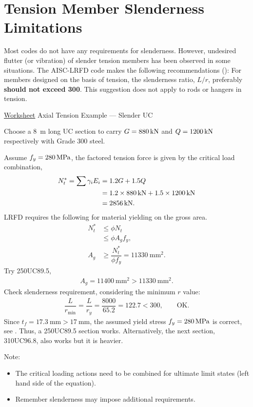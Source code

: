 \section{Tension Member Slenderness Limitations}
Most codes do not have any requirements for slenderness.
However, undesired flutter (or vibration) of slender tension members has been observed in some situations.
The AISC-LRFD code makes the following recommendations (): For members designed on the basis of tension, the slenderness ratio, $L/r$, preferably \textbf{should not exceed 300}.
This suggestion does not apply to rods or hangers in tension.
\begin{exmp}\href{run:./WORKSHEET/CH03/EX3.ATUC.sm}{Worksheet}
Axial Tension Example --- Slender UC

Choose a \SI{8}{\meter} long UC section to carry $G=\SI{880}{\kilo\newton}$ and $Q=\SI{1200}{\kilo\newton}$ respectively with Grade 300 steel.
\end{exmp}
\begin{solution}
Assume $f_y=\SI{280}{\mega\pascal}$, the factored tension force is given by the critical load combination,
\begin{align*}
N^*_t=\sum\gamma_iE_i&=1.2G+1.5Q\\
&=1.2\times\SI{880}{\kilo\newton}+1.5\times\SI{1200}{\kilo\newton}\\
&=\SI{2856}{\kilo\newton}.
\end{align*}
LRFD requires the following for material yielding on the gross area.
\begin{align*}
N^*_t&\leqslant\phi{}N_t\\
&\leqslant\phi{}A_gf_y,\\
A_g&\geqslant\dfrac{N^*_t}{\phi{}f_y}=\SI{11330}{\mm^2}.
\end{align*}
Try 250UC89.5,
\begin{gather*}
A_g=\SI{11400}{\mm^2}>\SI{11330}{\mm^2}.
\end{gather*}
Check slenderness requirement, considering the minimum $r$ value:
\begin{gather*}
\dfrac{L}{r_\text{min}}=\dfrac{L}{r_y}=\dfrac{8000}{65.2}=\num{122.7}<\num{300},\qquad\text{OK.}
\end{gather*}
Since $t_f=\SI{17.3}{\mm}>\SI{17}{\mm}$, the assumed yield stress $f_y=\SI{280}{\mega\pascal}$ is correct, see .
Thus, a 250UC89.5 section works.
Alternatively, the next section, 310UC96.8, also works but it is heavier.

Note:
\begin{itemize}
\item The critical loading actions need to be combined for ultimate limit states (left hand side of the equation).
\item Remember slenderness may impose additional requirements.
\end{itemize}
\end{solution}

